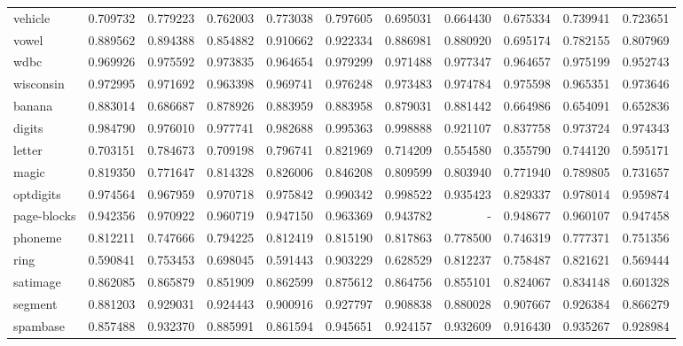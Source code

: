 \begin{tabular}{lrrrrrrrrrr}
vehicle         &   0.709732 &  0.779223 &  0.762003 &  0.773038 &  0.797605 &  0.695031 &  0.664430 &  0.675334 &  0.739941 &  0.723651 \\
vowel           &   0.889562 &  0.894388 &  0.854882 &  0.910662 &  0.922334 &  0.886981 &  0.880920 &  0.695174 &  0.782155 &  0.807969 \\
wdbc            &   0.969926 &  0.975592 &  0.973835 &  0.964654 &  0.979299 &  0.971488 &  0.977347 &  0.964657 &  0.975199 &  0.952743 \\
wisconsin       &   0.972995 &  0.971692 &  0.963398 &  0.969741 &  0.976248 &  0.973483 &  0.974784 &  0.975598 &  0.965351 &  0.973646 \\
banana          &   0.883014 &  0.686687 &  0.878926 &  0.883959 &  0.883958 &  0.879031 &  0.881442 &  0.664986 &  0.654091 &  0.652836 \\
digits          &   0.984790 &  0.976010 &  0.977741 &  0.982688 &  0.995363 &  0.998888 &  0.921107 &  0.837758 &  0.973724 &  0.974343 \\
letter          &   0.703151 &  0.784673 &  0.709198 &  0.796741 &  0.821969 &  0.714209 &  0.554580 &  0.355790 &  0.744120 &  0.595171 \\
magic           &   0.819350 &  0.771647 &  0.814328 &  0.826006 &  0.846208 &  0.809599 &  0.803940 &  0.771940 &  0.789805 &  0.731657 \\
optdigits       &   0.974564 &  0.967959 &  0.970718 &  0.975842 &  0.990342 &  0.998522 &  0.935423 &  0.829337 &  0.978014 &  0.959874 \\
page-blocks     &   0.942356 &  0.970922 &  0.960719 &  0.947150 &  0.963369 &  0.943782 &       - &  0.948677 &  0.960107 &  0.947458 \\
phoneme         &   0.812211 &  0.747666 &  0.794225 &  0.812419 &  0.815190 &  0.817863 &  0.778500 &  0.746319 &  0.777371 &  0.751356 \\
ring            &   0.590841 &  0.753453 &  0.698045 &  0.591443 &  0.903229 &  0.628529 &  0.812237 &  0.758487 &  0.821621 &  0.569444 \\
satimage        &   0.862085 &  0.865879 &  0.851909 &  0.862599 &  0.875612 &  0.864756 &  0.855101 &  0.824067 &  0.834148 &  0.601328 \\
segment         &   0.881203 &  0.929031 &  0.924443 &  0.900916 &  0.927797 &  0.908838 &  0.880028 &  0.907667 &  0.926384 &  0.866279 \\
spambase        &   0.857488 &  0.932370 &  0.885991 &  0.861594 &  0.945651 &  0.924157 &  0.932609 &  0.916430 &  0.935267 &  0.928984 \\

\end{tabular}
